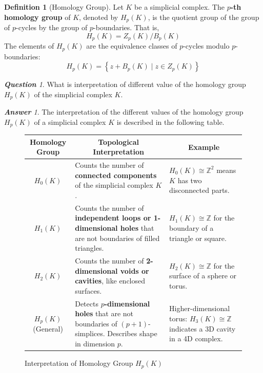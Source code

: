 \documentclass[12pt,oneside,reqno]{amsart}
\theoremstyle{plain}
\theoremstyle{definition}
\newtheorem{definition}[theorem]{Definition}
\theoremstyle{remark}
\newtheorem{question}[]{\textbf{Question}}
\newtheorem{answer}{\textbf{Answer}}
\newcommand{\0}{{\textbf{0}}}
\begin{document}
\begin{definition}[Homology Group]\label{d:Homology Group}
Let $K$ be a simplicial complex. The \textbf{$p$-th homology group} of $K$, denoted by $H_p(K)$, is the quotient group of the group of $p$-cycles by the group of $p$-boundaries. That is,
\[
H_p(K) = Z_p(K) / B_p(K)
\]
The elements of $H_p(K)$ are the equivalence classes of $p$-cycles modulo $p$-boundaries:
\[
H_p(K) = \left\{ z + B_p(K) \mid z \in Z_p(K) \right\}
\]
\end{definition}
\begin{question}
What is interpretation of different value of the homology group $H_{p}(K)$ of the simplicial complex $K$.   
\end{question}

\begin{answer}
The interpretation of the different values of the homology group $H_{p}(K)$ of a simplicial complex $K$ is described in the following table.
\begin{figure}[h!]
\centering
\renewcommand{\arraystretch}{1.8}
\begin{tabular}{|c|m{6.5cm}|m{5cm}|}
\hline
\multicolumn{1}{|c|}{\textbf{Homology Group}} & 
\multicolumn{1}{c|}{\textbf{Topological Interpretation}} & 
\multicolumn{1}{c|}{\textbf{Example}} \\
\hline
$H_0(K)$ & Counts the number of \textbf{connected components} of the simplicial complex $K$. & $H_0(K) \cong \mathbb{Z}^2$ means $K$ has two disconnected parts. \\
\hline
$H_1(K)$ & Counts the number of \textbf{independent loops or 1-dimensional holes} that are not boundaries of filled triangles. & $H_1(K) \cong \mathbb{Z}$ for the boundary of a triangle or square. \\
\hline
$H_2(K)$ & Counts the number of \textbf{2-dimensional voids or cavities}, like enclosed surfaces. & $H_2(K) \cong \mathbb{Z}$ for the surface of a sphere or torus. \\
\hline
$H_p(K)$ (General) & Detects \textbf{$p$-dimensional holes} that are not boundaries of $(p+1)$-simplices. Describes shape in dimension $p$. & Higher-dimensional torus: $H_3(K) \cong \mathbb{Z}$ indicates a 3D cavity in a 4D complex. \\
\hline
\end{tabular}
\caption{Interpretation of Homology Group $H_{p}(K)$}
\label{fig:Interpretation of Homology Group}
\end{figure}
\end{answer}
\end{document}
